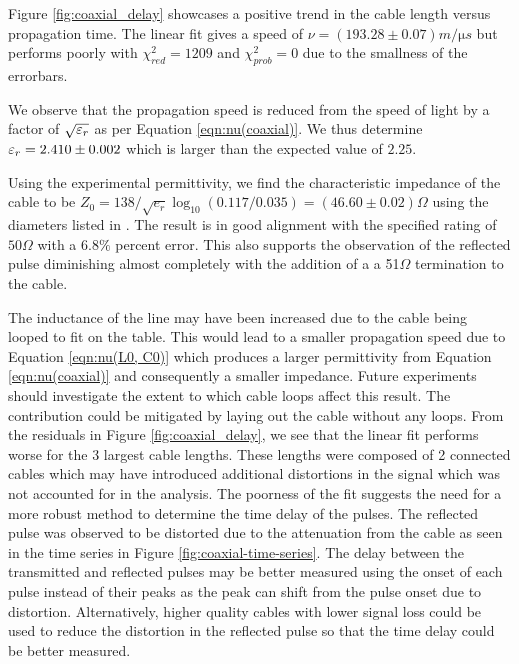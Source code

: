 \documentclass[
	a4paper, %
	10pt, %
	twoside, %
]{journal}
\begin{document}
Figure \ref{fig:coaxial_delay} showcases a positive trend in the cable length versus propagation time. The linear fit gives a speed of $\nu = (193.28 \pm 0.07)\unit{m/\micro s}$ but performs poorly with $\chi^2_{red} = 1209$ and $\chi^2_{prob} = 0$ due to the smallness of the errorbars. 

We observe that the propagation speed is reduced from the speed of light by a factor of $\sqrt{\varepsilon_r}$ as per Equation \ref{eqn:nu(coaxial)}. We thus determine $\varepsilon_r = 2.410 \pm 0.002$ which is larger than the expected value of $2.25$. 

Using the experimental permittivity, we find the characteristic impedance of the cable to be $Z_0 = 138/\sqrt{e_r} \log_{10}(0.117/0.035) = (46.60 \pm 0.02)\Omega$ using the diameters listed in \autocite{Belden8259_BNC_Datasheet}. The result is in good alignment with the specified rating of $50\Omega$ with a $6.8\%$ percent error. This also supports the observation of the reflected pulse diminishing almost completely with the addition of a a 51$\Omega$ termination to the cable.

The inductance of the line may have been increased due to the cable being looped to fit on the table. This would lead to a smaller propagation speed due to Equation \ref{eqn:nu(L0, C0)} which produces a larger permittivity from Equation \ref{eqn:nu(coaxial)} and consequently a smaller impedance. Future experiments should investigate the extent to which cable loops affect this result. The contribution could be mitigated by laying out the cable without any loops. 
From the residuals in Figure \ref{fig:coaxial_delay}, we see that the linear fit performs worse for the 3 largest cable lengths. These lengths were composed of 2 connected cables which may have introduced additional distortions in the signal which was not accounted for in the analysis. The poorness of the fit suggests the need for a more robust method to determine the time delay of the pulses. The reflected pulse was observed to be distorted due to the attenuation from the cable as seen in the time series in Figure \ref{fig:coaxial-time-series}. The delay between the transmitted and reflected pulses may be better measured using the onset of each pulse instead of their peaks as the peak can shift from the pulse onset due to distortion. Alternatively, higher quality cables with lower signal loss could be used to reduce the distortion in the reflected pulse so that the time delay could be better measured.
\end{document}

